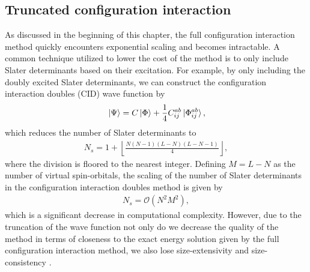        \subsection{Truncated configuration interaction}
            \label{sub:truncated-configuration-interaction}
            As discussed in the beginning of this chapter, the full
            configuration interaction method quickly encounters exponential
            scaling and becomes intractable.
            A common technique utilized to lower the cost of the method is to
            only include Slater determinants based on their excitation.
            For example, by only including the doubly excited Slater
            determinants, we can construct the configuration interaction doubles
            (CID) wave function by
            \begin{align}
                \ket*{\Psi} = C\ket*{\Phi}
                + \frac{1}{4} C^{ab}_{ij} \ket*{\Phi^{ab}_{ij}},
            \end{align}
            which reduces the number of Slater determinants to
            \begin{align}
                N_s = 1 + \left\lfloor\frac{N(N - 1)(L - N)(L - N -
                1)}{4}\right\rfloor,
            \end{align}
            where the division is floored to the nearest integer.
            Defining $M = L - N$ as the number of virtual spin-orbitals, the
            scaling of the number of Slater determinants in the configuration
            interaction doubles method is given by
            \begin{align}
                N_s = \mathcal{O}(N^2 M^2),
            \end{align}
            which is a significant decrease in computational complexity.
            However, due to the truncation of the wave function not only do we
            decrease the quality of the method in terms of closeness to the
            exact energy solution given by the full configuration interaction
            method, we also lose size-extensivity and size-consistency
            \cite{crawford2000introduction, helgaker-molecular}.

